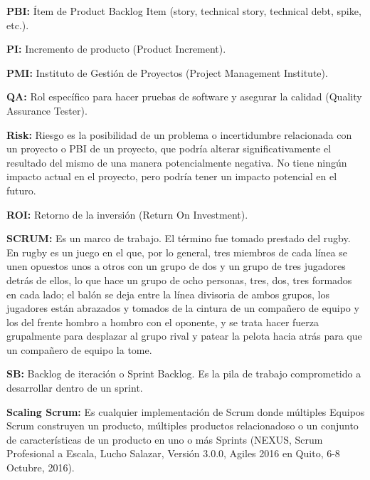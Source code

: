\begin{description}
  \item {\textbf{PBI:} Ítem de Product Backlog Item (story, technical story, technical debt, spike, etc.).}
  
  \item {\textbf{PI:} Incremento de producto (Product Increment).}
  
  \item {\textbf{PMI:} Instituto de Gestión de Proyectos (Project Management Institute).}
  
  \item {\textbf{QA:} Rol específico para hacer pruebas de software y asegurar la calidad (Quality Assurance Tester).}
  
  \item {\textbf{Risk:} Riesgo es la posibilidad de un problema o incertidumbre relacionada con un proyecto o PBI de un proyecto, que podría alterar significativamente el resultado del mismo de una manera potencialmente negativa. No tiene ningún impacto actual en el proyecto, pero podría tener un impacto potencial en el futuro.}
  
  \item {\textbf{ROI:} Retorno de la inversión (Return On Investment).}
  
  \item {\textbf{SCRUM:} Es un marco de trabajo. El término fue tomado prestado del rugby. En rugby es un juego en el que, por lo general, tres miembros de cada línea se unen opuestos unos a otros con un grupo de dos y un grupo de tres jugadores detrás de ellos, lo que hace un grupo de ocho personas, tres, dos, tres formados en cada lado; el balón se deja entre la línea divisoria de ambos grupos, los jugadores están abrazados y tomados de la cintura de un compañero de equipo y los del frente hombro a hombro con el oponente, y se trata hacer fuerza grupalmente para desplazar al grupo rival y patear la pelota hacia atrás para que un compañero de equipo la tome.}
  
  \item {\textbf{SB:} Backlog de iteración o Sprint Backlog. Es la pila de trabajo comprometido a desarrollar dentro de un sprint.}
  
  \item {\textbf{Scaling Scrum:} Es cualquier implementación de Scrum donde múltiples Equipos Scrum construyen un producto, múltiples productos relacionadoso o un conjunto de características de un producto en uno o más Sprints (NEXUS, Scrum Profesional a Escala, Lucho Salazar, Versión 3.0.0,  Agiles 2016 en Quito, 6-8 Octubre, 2016).}
  

\end{description}

